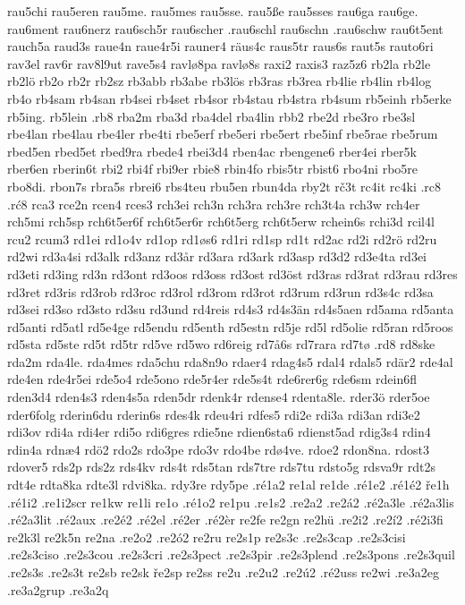 {{rau5chi
rau5eren
rau5me.
rau5mes
rau5sse.
rau5ße
rau5sses
rau6ga
rau6ge.
rau6ment
rau6nerz
rau6sch5r
rau6scher
.rau6schl
rau6schn
.rau6schw
rau6t5ent
rauch5a
raud3s
raue4n
raue4r5i
rauner4
räus4c
raus5tr
raus6s
raut5s
rauto6ri
rav3el
rav6r
rav8l9ut
rave5s4
ravlø8pa
ravlø8s
raxi2
raxis3
raz5z6
rb2la
rb2le
rb2lö
rb2o
rb2r
rb2sz
rb3abb
rb3abe
rb3lös
rb3ras
rb3rea
rb4lie
rb4lin
rb4log
rb4o
rb4sam
rb4san
rb4sei
rb4set
rb4sor
rb4stau
rb4stra
rb4sum
rb5einh
rb5erke
rb5ing.
rb5lein
.rb8
rba2m
rba3d
rba4del
rba4lin
rbb2
rbe2d
rbe3ro
rbe3sl
rbe4lan
rbe4lau
rbe4ler
rbe4ti
rbe5erf
rbe5eri
rbe5ert
rbe5inf
rbe5rae
rbe5rum
rbed5en
rbed5et
rbed9ra
rbede4
rbei3d4
rben4ac
rbengene6
rber4ei
rber5k
rber6en
rberin6t
rbi2
rbi4f
rbi9er
rbie8
rbin4fo
rbis5tr
rbist6
rbo4ni
rbo5re
rbo8di.
rbon7s
rbra5s
rbrei6
rbs4teu
rbu5en
rbun4da
rby2t
rč3t
rc4it
rc4ki
.rc8
.rć8
rca3
rce2n
rcen4
rces3
rch3ei
rch3n
rch3ra
rch3re
rch3t4a
rch3w
rch4er
rch5mi
rch5sp
rch6t5er6f
rch6t5er6r
rch6t5erg
rch6t5erw
rchein6s
rchi3d
rcil4l
rcu2
rcum3
rd1ei
rd1o4v
rd1op
rd1øs6
rd1ri
rd1sp
rd1t
rd2ac
rd2i
rd2rö
rd2ru
rd2wi
rd3a4si
rd3alk
rd3anz
rd3år
rd3ara
rd3ark
rd3asp
rd3d2
rd3e4ta
rd3ei
rd3eti
rd3ing
rd3n
rd3ont
rd3oos
rd3oss
rd3ost
rd3öst
rd3ras
rd3rat
rd3rau
rd3res
rd3ret
rd3ris
rd3rob
rd3roc
rd3rol
rd3rom
rd3rot
rd3rum
rd3run
rd3s4c
rd3sa
rd3sei
rd3so
rd3sto
rd3su
rd3und
rd4reis
rd4s3
rd4s3än
rd4s5aen
rd5ama
rd5anta
rd5anti
rd5atl
rd5e4ge
rd5endu
rd5enth
rd5estn
rd5je
rd5l
rd5olie
rd5ran
rd5roos
rd5sta
rd5ste
rd5t
rd5tr
rd5ve
rd5wo
rd6reig
rd7å6s
rd7rara
rd7tø
.rd8
rd8ske
rda2m
rda4le.
rda4mes
rda5chu
rda8n9o
rdaer4
rdag4s5
rdal4
rdals5
rdär2
rde4al
rde4en
rde4r5ei
rde5o4
rde5ono
rde5r4er
rde5s4t
rde6rer6g
rde6sm
rdein6fl
rden3d4
rden4s3
rden4s5a
rden5dr
rdenk4r
rdense4
rdenta8le.
rder3ö
rder5oe
rder6folg
rderin6du
rderin6s
rdes4k
rdeu4ri
rdfes5
rdi2e
rdi3a
rdi3an
rdi3e2
rdi3ov
rdi4a
rdi4er
rdi5o
rdi6gres
rdie5ne
rdien6sta6
rdienst5ad
rdig3s4
rdin4
rdin4a
rdnæ4
rdö2
rdo2s
rdo3pe
rdo3v
rdo4be
rdø4ve.
rdoe2
rdon8na.
rdost3
rdover5
rds2p
rds2z
rds4kv
rds4t
rds5tan
rds7tre
rds7tu
rdsto5g
rdsva9r
rdt2s
rdt4e
rdta8ka
rdte3l
rdvi8ka.
rdy3re
rdy5pe
.ré1a2
re1al
re1de
.ré1e2
.ré1é2
ře1h
.ré1i2
.re1i2scr
re1kw
re1li
re1o
.ré1o2
re1pu
.re1s2
.re2a2
.re2á2
.ré2a3le
.ré2a3lis
.ré2a3lit
.ré2aux
.re2é2
.ré2el
.ré2er
.ré2èr
re2fe
re2gn
re2hü
.re2i2
.re2í2
.ré2i3fi
re2k3l
re2k5n
re2na
.re2o2
.re2ó2
re2ru
re2s1p
re2s3c
.re2s3cap
.re2s3cisi
.re2s3ciso
.re2s3cou
.re2s3cri
.re2s3pect
.re2s3pir
.re2s3plend
.re2s3pons
.re2s3quil
.re2s3s
.re2s3t
re2sb
re2sk
ře2sp
re2ss
re2u
.re2u2
.re2ú2
.ré2uss
re2wi
.re3a2eg
.re3a2grup
.re3a2q
}}
